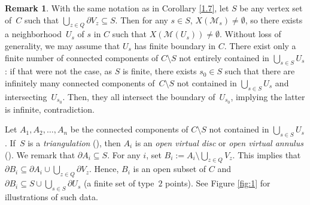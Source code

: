\documentclass[JEP,XML,SOM,Unicode,NoFloatCountersInSection,published]{cedram}
\let\backslash\setminus
\theoremstyle{definition}
\newtheorem{rem}[thm]{Remark}
\begin{document}
\begin{rem} \label{1.11} With the same notation as in Corollary \ref{1.7}, let $S$ be any vertex set of~$C$ such that $\bigcup_{z \in Q} \partial{V_z} \subseteq S$. Then for any $s \in S$, $X(\mathscr{M}_s) \neq \emptyset$, so there exists a neighborhood~$U_s$ of $s$ in $C$ such that $X(\mathscr{M}(U_s)) \neq \emptyset$. Without loss of generality, we may assume that $U_s$ has finite boundary in $C$.
There exist only a finite number of connected components of $C \backslash S$ not entirely contained in $\bigcup_{s \in S} U_s$: if that were not the case, as $S$ is finite, there exists $s_0 \in S$ such that there are infinitely many connected components of~$C \backslash S$ not contained in $\bigcup_{s\in S} U_s$ and intersecting~$U_{s_0}$. Then, they all intersect the boundary of~$U_{s_0}$, implying the latter is infinite, contradiction.

Let $A_1, A_2, \dots, A_n$ be the connected components of $C \backslash S$ not contained in $\bigcup_{s \in S} U_s$. If~$S$ is a \emph{triangulation} (\cf \cite[5.1.13]{duc}), then $A_i$ is an \emph{open virtual disc} or \emph{open virtual annulus} (\cf \cite[p.\,210]{duc}).
We remark that $\partial{A_i} \subseteq S$. For any $i$, set $B_i:= A_i \backslash \bigcup_{z \in Q} V_z$. This implies that $\partial{B_i} \subseteq \partial{A_i} \cup \bigcup_{z \in Q} \partial{V_z}$. Hence, $B_i$ is an open subset of $C$ and $\partial{B_i} \subseteq S \cup \bigcup_{s \in S} \partial{U_s}$ (\ie a finite set of type~$2$ points). See Figure \ref{fig:1} for illustrations of such data.


\end{rem}
\end{document}
